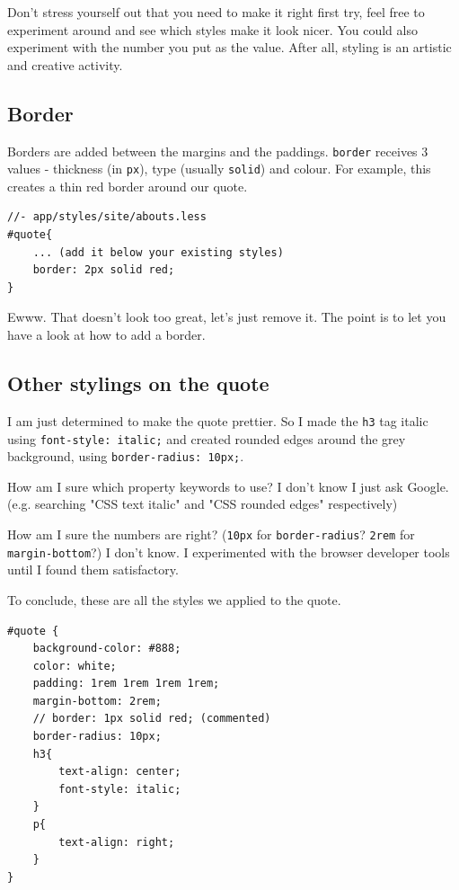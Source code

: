 Don't stress yourself out that you need to make it right first try, feel free to experiment around and see which styles make it look nicer. You could also experiment with the number you put as the value. After all, styling is an artistic and creative activity. 

\subsection*{Border}

Borders are added between the margins and the paddings. \texttt{border} receives 3 values - thickness (in \texttt{px}), type (usually \texttt{solid}) and colour. For example, this creates a thin red border around our quote.

\begin{lstlisting}[language=pug]
//- app/styles/site/abouts.less
#quote{
    ... (add it below your existing styles)
    border: 2px solid red;
}
\end{lstlisting}

Ewww. That doesn't look too great, let's just remove it. The point is to let you have a look at how to add a border. 

\subsection*{Other stylings on the quote}

I am just determined to make the quote prettier. So I made the \texttt{h3} tag italic using \texttt{font-style: italic;} and created rounded edges around the grey background, using \texttt{border-radius: 10px;}. 
\vspace{6mm}

How am I sure which property keywords to use? I don't know I just ask Google. (e.g. searching "CSS text italic" and "CSS rounded edges" respectively)
\vspace{6mm}

How am I sure the numbers are right? (\texttt{10px} for \texttt{border-radius}? \texttt{2rem} for \texttt{margin-bottom}?) I don't know. I experimented with the browser developer tools until I found them satisfactory.
\vspace{6mm}

To conclude, these are all the styles we applied to the quote.

\begin{lstlisting}[language=pug]
#quote {
    background-color: #888;
    color: white;
    padding: 1rem 1rem 1rem 1rem;
    margin-bottom: 2rem;
    // border: 1px solid red; (commented)
    border-radius: 10px;
    h3{
        text-align: center;
        font-style: italic;
    }
    p{
        text-align: right;
    }
}
\end{lstlisting}

